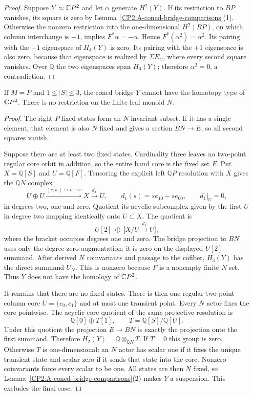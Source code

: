 \begin{proof}
Suppose $Y\simeq\mathbb{C}P^2$ and let $\alpha$ generate $H^2(Y)$.
If its restriction to $BP$ vanishes, its square is zero by
Lemma~\ref{CP2:A-coned-bridge-comparisons}(1). Otherwise the
nonzero restriction into the one-dimensional $H^2(BP)$,
on which column interchange is $-1$, implies
$F^*\alpha=-\alpha$. Hence $F^*(\alpha^2)=\alpha^2$.
Its pairing with the $-1$ eigenspace of $H_4(Y)$ is zero.
Its pairing with the $+1$ eigenspace is also zero, because
that eigenspace is realized by $\Sigma E_U$, where every
second square vanishes. Over $\mathbb Q$ the two eigenspaces
span $H_4(Y)$; therefore $\alpha^2=0$, a contradiction.
\end{proof}

\begin{proposition}
\label{CP2:A-coned-three-center-P5}
If $M=P$ and $1\leq |S|\leq3$, the coned bridge $Y$ cannot
have the homotopy type of $\mathbb{C}P^2$. There is no restriction on
the finite leaf monoid $N$.
\end{proposition}
\begin{proof}
The right $P$ fixed states form an $N$ invariant subset.
If it has a single element, that element is also $N$ fixed
and gives a section $BN\to E$, so all second squares vanish.

Suppose there are at least two fixed states. Cardinality
three leaves no two-point regular core orbit in addition,
so the entire band core is the fixed set $F$. Put
$X=\mathbb Q[S]$ and $U=\mathbb Q[F]$. Tensoring the explicit
left $\mathbb QP$ resolution with $X$ gives the $\mathbb QN$
complex
\[
 U\oplus U \xrightarrow{(v,w)\mapsto v+w} X
 \xrightarrow{d_1} U,
 \qquad d_1(s)=s e_{10}-s e_{00},\qquad d_1|_U=0,
\]
in degrees two, one and zero. Quotient its acyclic subcomplex
given by the first $U$ in degree two mapping identically onto
$U\subset X$. The quotient is
\[
 U[2]\ \oplus\ \bigl[X/U\xrightarrow{\bar d_1}U\bigr],
\]
where the bracket occupies degrees one and zero. The bridge
projection to $BN$ uses only the degree-zero augmentation;
it is zero on the displayed $U[2]$ summand. After derived
$N$ coinvariants and passage to the cofiber, $H_3(Y)$ has
the direct summand $U_N$. This is nonzero because $F$ is a
nonempty finite $N$ set. Thus $Y$ does not have the homology
of $\mathbb{C}P^2$.

It remains that there are no fixed states. There is then
one regular two-point column core $U=\{c_0,c_1\}$ and at
most one transient point. Every $N$ actor fixes the core
pointwise. The acyclic-core quotient of the same projective
resolution is
\[
 \mathbb Q[0]\oplus T[1],\qquad
 T=\mathbb Q[S]/\mathbb Q[U].
\]
Under this quotient the projection $E\to BN$ is exactly the
projection onto the first summand. Therefore
$H_2(Y)=\mathbb Q\otimes_{\mathbb QN}T$. If $T=0$ this group
is zero. Otherwise $T$ is one-dimensional: an $N$ actor has
scalar one if it fixes the unique transient state and scalar
zero if it sends that state into the core. Nonzero coinvariants
force every scalar to be one. All states are then $N$ fixed,
so Lemma~\ref{CP2:A-coned-bridge-comparisons}(2) makes $Y$ a
suspension. This excludes the final case.
\end{proof}

